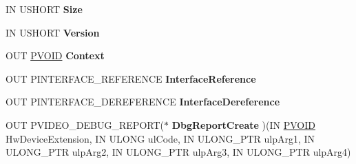 \begin{DoxyCompactItemize}
\item 
\mbox{\label{struct___v_i_d_e_o___p_o_r_t___d_e_b_u_g___r_e_p_o_r_t___i_n_t_e_r_f_a_c_e_a7f91a5b9252e199cef9ae77e0df70ea6}} 
IN U\+S\+H\+O\+RT {\bfseries Size}
\item 
\mbox{\label{struct___v_i_d_e_o___p_o_r_t___d_e_b_u_g___r_e_p_o_r_t___i_n_t_e_r_f_a_c_e_a33538c8c7a0e0c2768c029e11b985924}} 
IN U\+S\+H\+O\+RT {\bfseries Version}
\item 
\mbox{\label{struct___v_i_d_e_o___p_o_r_t___d_e_b_u_g___r_e_p_o_r_t___i_n_t_e_r_f_a_c_e_aba21253d043c7495b3283018e6702b4d}} 
O\+UT \hyperlink{interfacevoid}{P\+V\+O\+ID} {\bfseries Context}
\item 
\mbox{\label{struct___v_i_d_e_o___p_o_r_t___d_e_b_u_g___r_e_p_o_r_t___i_n_t_e_r_f_a_c_e_aaea54ee3d4e510429f0f4c2ec286cd01}} 
O\+UT P\+I\+N\+T\+E\+R\+F\+A\+C\+E\+\_\+\+R\+E\+F\+E\+R\+E\+N\+CE {\bfseries Interface\+Reference}
\item 
\mbox{\label{struct___v_i_d_e_o___p_o_r_t___d_e_b_u_g___r_e_p_o_r_t___i_n_t_e_r_f_a_c_e_ab76656dbba34ec09919057884b201574}} 
O\+UT P\+I\+N\+T\+E\+R\+F\+A\+C\+E\+\_\+\+D\+E\+R\+E\+F\+E\+R\+E\+N\+CE {\bfseries Interface\+Dereference}
\item 
\mbox{\label{struct___v_i_d_e_o___p_o_r_t___d_e_b_u_g___r_e_p_o_r_t___i_n_t_e_r_f_a_c_e_af918e499bd4aa486017411441204f74b}} 
O\+UT P\+V\+I\+D\+E\+O\+\_\+\+D\+E\+B\+U\+G\+\_\+\+R\+E\+P\+O\+RT($\ast$ {\bfseries Dbg\+Report\+Create} )(IN \hyperlink{interfacevoid}{P\+V\+O\+ID} Hw\+Device\+Extension, IN U\+L\+O\+NG ul\+Code, IN U\+L\+O\+N\+G\+\_\+\+P\+TR ulp\+Arg1, IN U\+L\+O\+N\+G\+\_\+\+P\+TR ulp\+Arg2, IN U\+L\+O\+N\+G\+\_\+\+P\+TR ulp\+Arg3, IN U\+L\+O\+N\+G\+\_\+\+P\+TR ulp\+Arg4)
\item 
\mbox{\label{struct___v_i_d_e_o___p_o_r_t___d_e_b_u_g___r_e_p_o_r_t___i_n_t_e_r_f_a_c_e_aba1f9dd37e9a4ff90213e643d63d6630}} 

\end{DoxyCompactItemize}
